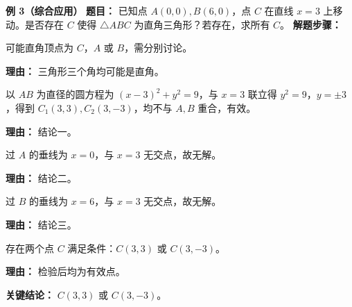 \begin{examplebox}
	\medskip
	\textbf{\textcolor{CExample}{例 3（综合应用）}}
	\textbf{\textcolor{CExample}{题目：}}
	已知点 $A(0,0), B(6,0)$，点 $C$ 在直线 $x=3$ 上移动。是否存在 $C$ 使得 $\triangle ABC$ 为直角三角形？若存在，求所有 $C$。
	\textbf{\textcolor{CExample}{解题步骤：}}
	\begin{description}[style=nextline, leftmargin=2.8em, labelsep=0.5em, itemsep=0.45em]
		\item[\textbf{第一步（分类直角顶点）：}]
			可能直角顶点为 $C$，$A$ 或 $B$，需分别讨论。
			\par\textbf{理由：} 三角形三个角均可能是直角。
		\item[\textbf{第二步（$\angle C=90^\circ$）：}]
			以 $AB$ 为直径的圆方程为 $(x-3)^2+y^2=9$，与 $x=3$ 联立得 $y^2=9$，$y=\pm3$，得到 $C_1(3,3),C_2(3,-3)$，均不与 $A,B$ 重合，有效。
			\par\textbf{理由：} 结论一。
		\item[\textbf{第三步（$\angle A=90^\circ$）：}]
			过 $A$ 的垂线为 $x=0$，与 $x=3$ 无交点，故无解。
			\par\textbf{理由：} 结论二。
		\item[\textbf{第四步（$\angle B=90^\circ$）：}]
			过 $B$ 的垂线为 $x=6$，与 $x=3$ 无交点，故无解。
			\par\textbf{理由：} 结论三。
		\item[\textbf{第五步（总结）：}]
			存在两个点 $C$ 满足条件：$C(3,3)$ 或 $C(3,-3)$。
			\par\textbf{理由：} 检验后均为有效点。
	\end{description}
	\textbf{\textcolor{CExample}{关键结论：}}
	$C(3,3)$ 或 $C(3,-3)$。
\end{examplebox}
